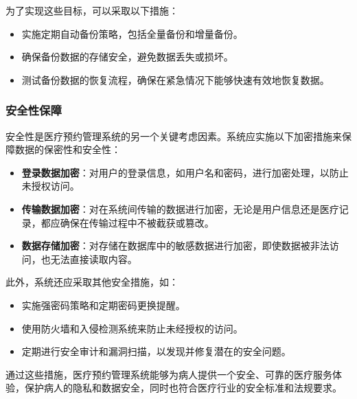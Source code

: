 为了实现这些目标，可以采取以下措施：

\begin{itemize}
	\item 实施定期自动备份策略，包括全量备份和增量备份。
	\item 确保备份数据的存储安全，避免数据丢失或损坏。
	\item 测试备份数据的恢复流程，确保在紧急情况下能够快速有效地恢复数据。
\end{itemize}

\subsubsection*{安全性保障}
安全性是医疗预约管理系统的另一个关键考虑因素。系统应实施以下加密措施来保障数据的保密性和安全性：

\begin{itemize}
	\item \textbf{登录数据加密}：对用户的登录信息，如用户名和密码，进行加密处理，以防止未授权访问。
	
	\item \textbf{传输数据加密}：对在系统间传输的数据进行加密，无论是用户信息还是医疗记录，都应确保在传输过程中不被截获或篡改。
	
	\item \textbf{数据存储加密}：对存储在数据库中的敏感数据进行加密，即使数据被非法访问，也无法直接读取内容。
\end{itemize}

此外，系统还应采取其他安全措施，如：

\begin{itemize}
	\item 实施强密码策略和定期密码更换提醒。
	\item 使用防火墙和入侵检测系统来防止未经授权的访问。
	\item 定期进行安全审计和漏洞扫描，以发现并修复潜在的安全问题。
\end{itemize}

通过这些措施，医疗预约管理系统能够为病人提供一个安全、可靠的医疗服务体验，保护病人的隐私和数据安全，同时也符合医疗行业的安全标准和法规要求。